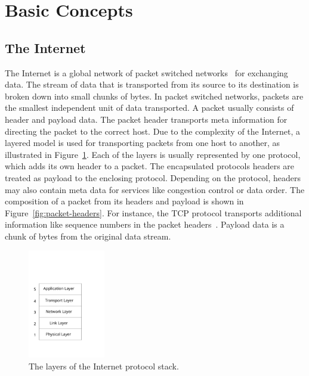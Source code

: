 \documentclass[a4paper,
		12pt,
		parskip=full,
		titlepage
		]{scrartcl}
\begin{document}
\section{Basic Concepts}
\subsection{The Internet}
The Internet is a global network of packet switched networks~\cite[Chapter 1.1]{kurose_ross} for exchanging data. 
The stream of data that is transported from its source to its destination is broken down into small chunks of bytes.
In packet switched networks, packets are the smallest independent unit of data transported.
A packet usually consists of header and payload data.
The packet header transports meta information for directing the packet to the correct host.
Due to the complexity of the Internet, a layered model is used for transporting 
packets from one host to another, as illustrated in Figure~\ref{fig:layermodel}.
Each of the layers is usually represented by one protocol, which adds its own header to a packet.
The encapsulated protocols headers are treated as payload to the enclosing protocol.
Depending on the protocol, headers may also contain meta data for services like congestion control or data order.
The composition of a packet from its headers and payload is shown in Figure~\ref{fig:packet-headers}.
For instance, the TCP protocol transports additional information like sequence numbers in the packet headers~\cite[Chapter 3.5]{kurose_ross}.
Payload data is a chunk of bytes from the original data stream.

\begin{figure}
\centering
\includegraphics[width=0.3\textwidth]{images/internet-layers}
\caption{The layers of the Internet protocol stack.}
\label{fig:layermodel}
\end{figure}
\end{document}
